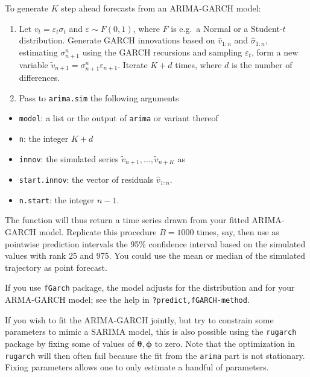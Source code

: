 \documentclass[]{book}
\providecommand{\tightlist}{%
  \setlength{\itemsep}{0pt}\setlength{\parskip}{0pt}}
\begin{document}
To generate \(K\) step ahead forecasts from an ARIMA-GARCH model:

\begin{enumerate}
\def\labelenumi{\arabic{enumi}.}
\tightlist
\item
  Let \(v_t=\varepsilon_t\sigma_t\) and \(\varepsilon \sim F(0, 1)\), where \(F\) is e.g.~a Normal or a Student-\(t\) distribution.
  Generate GARCH innovations based on \(\widehat{v}_{1:n}\) and \(\widehat{\sigma}_{1:n}\), estimating \({\sigma}_{n+1}^{n}\) using the GARCH recursions and sampling \(\varepsilon_t\), form a new variable \(\widetilde{v}_{n+1} = {\sigma}_{n+1}^{n}\varepsilon_{n+1}\). Iterate \(K+d\) times, where \(d\) is the number of differences.
\item
  Pass to \texttt{arima.sim} the following arguments
\end{enumerate}

\begin{itemize}
\tightlist
\item
  \texttt{model}: a list or the output of \texttt{arima} or variant thereof
\item
  \texttt{n}: the integer \(K+d\)
\item
  \texttt{innov}: the simulated series \(\widetilde{v}_{n+1}, \ldots, \widetilde{v}_{n+K}\) as
\item
  \texttt{start.innov}: the vector of residuals \(\widehat{v}_{1:n}\).
\item
  \texttt{n.start}: the integer \(n-1\).
\end{itemize}

The function will thus return a time series drawn from your fitted ARIMA-GARCH model. Replicate this procedure \(B=1000\) times, say, then use as pointwise prediction intervals the 95\% confidence interval based on the simulated values with rank 25 and 975. You could use the mean or median of the simulated trajectory as point forecast.

If you use \texttt{fGarch} package, the model adjusts for the distribution and for your ARMA-GARCH model; see the help in \texttt{?\textquotesingle{}predict,fGARCH-method\textquotesingle{}}.

If you wish to fit the ARIMA-GARCH jointly, but try to constrain some parameters to mimic a SARIMA model, this is also possible using the \texttt{rugarch} package by fixing some of values of \(\boldsymbol{\theta}, \boldsymbol{\phi}\) to zero. Note that the optimization in \texttt{rugarch} will then often fail because the fit from the \texttt{arima} part is not stationary. Fixing parameters allows one to only estimate a handful of parameters.
\end{document}
